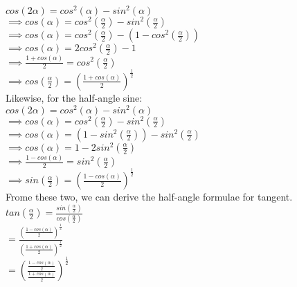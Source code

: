 \tab$cos(2\alpha) = cos^2(\alpha) - sin^2(\alpha)$\\

\tab$\implies cos(\alpha) = cos^2(\frac{\alpha}{2}) - sin^2(\frac{\alpha}{2})$\\

\tab$\implies cos(\alpha) = cos^2(\frac{\alpha}{2}) - (1 - cos^2(\frac{\alpha}{2}))$\\

\tab$\implies cos(\alpha) = 2cos^2(\frac{\alpha}{2}) -  1$\\

\tab$\implies \frac{1 + cos(\alpha)}{2} = cos^2(\frac{\alpha}{2})$\\

\tab$\implies cos(\frac{\alpha}{2}) = (\frac{1 + cos(\alpha)}{2})^{\frac{1}{2}}$\\

Likewise, for the half-angle sine:\\

\tab$cos(2\alpha) = cos^2(\alpha) - sin^2(\alpha)$\\

\tab$\implies cos(\alpha) = cos^2(\frac{\alpha}{2}) - sin^2(\frac{\alpha}{2})$\\

\tab$\implies cos(\alpha) = (1 - sin^2(\frac{\alpha}{2})) - sin^2(\frac{\alpha}{2})$\\

\tab$\implies cos(\alpha) = 1- 2sin^2(\frac{\alpha}{2})$\\

\tab$\implies \frac{1 - cos(\alpha)}{2} = sin^2(\frac{\alpha}{2})$\\

\tab$\implies sin(\frac{\alpha}{2}) = (\frac{1 - cos(\alpha)}{2})^{\frac{1}{2}}$\\

Frome these two, we can derive the half-angle formulae for tangent.\\

\tab$tan(\frac{\alpha}{2}) = \frac{sin(\frac{\alpha}{2})}{cos(\frac{\alpha}{2})}$\\

\tab$ = \frac{ (\frac{1 - cos(\alpha)}{2})^{\frac{1}{2}}}{ (\frac{1 + cos(\alpha)}{2})^{\frac{1}{2}}}$\\

\tab$ = (\frac{\frac{1 - cos(\alpha)}{2}}{\frac{1 + cos(\alpha)}{2}})^{\frac{1}{2}}$\\

